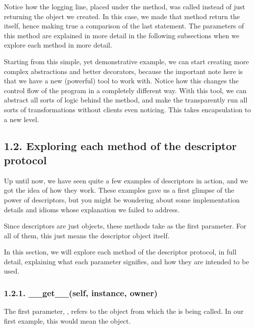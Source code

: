 \documentclass[a4paper,10pt,english]{sphinxmanual}
\begin{document}
Notice how the logging line, placed under the  method, was called instead of just
returning the object we created. In this case, we made that method return the  itself,
hence making true a comparison of the last statement. The parameters of this method are
explained in more detail in the following subsections when we explore each method in
more detail.

Starting from this simple, yet demonstrative example, we can start creating more complex
abstractions and better decorators, because the important note here is that we have a new
(powerful) tool to work with. Notice how this changes the control flow of the program in a
completely different way. With this tool, we can abstract all sorts of logic behind the
 method, and make the  transparently run all sorts of transformations
without clients even noticing. This takes encapsulation to a new level.


\subsection{1.2. Exploring each method of the descriptor protocol}
\label{\detokenize{chapters/6_descriptors/index:exploring-each-method-of-the-descriptor-protocol}}
Up until now, we have seen quite a few examples of descriptors in action, and we got the
idea of how they work. These examples gave us a first glimpse of the power of descriptors,
but you might be wondering about some implementation details and idioms whose
explanation we failed to address.

Since descriptors are just objects, these methods take  as the first parameter. For all of
them, this just means the descriptor object itself.

In this section, we will explore each method of the descriptor protocol, in full detail,
explaining what each parameter signifies, and how they are intended to be used.


\subsubsection{1.2.1. \_\_get\_\_(self, instance, owner)}
\label{\detokenize{chapters/6_descriptors/index:get-self-instance-owner}}
The first parameter, , refers to the object from which the  is being
called. In our first example, this would mean the  object.
\end{document}
